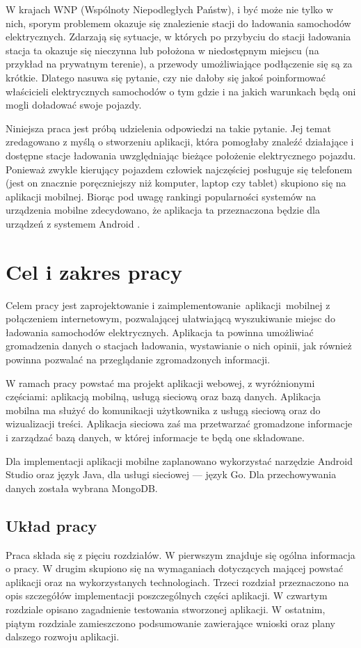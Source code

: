 W krajach WNP (Wspólnoty Niepodległych Państw), i być może nie tylko w nich, sporym problemem okazuje się znalezienie stacji do ładowania samochodów elektrycznych. Zdarzają się sytuacje, w których po przybyciu do stacji ładowania stacja ta okazuje się nieczynna lub położona w niedostępnym miejscu (na przykład na prywatnym terenie), a przewody umożliwiające podłączenie się są za krótkie. Dlatego nasuwa się pytanie, czy nie dałoby się jakoś poinformować właścicieli elektrycznych samochodów o tym gdzie i na jakich warunkach będą oni mogli doładować swoje pojazdy. 

Niniejsza praca jest próbą udzielenia odpowiedzi na takie pytanie. Jej temat zredagowano z myślą o stworzeniu aplikacji, która pomogłaby znaleźć działające i dostępne stacje ładowania uwzględniając bieżące położenie elektrycznego pojazdu. Ponieważ zwykle kierujący pojazdem człowiek najczęściej posługuje się telefonem (jest on znacznie poręczniejszy niż komputer, laptop czy tablet) skupiono się na aplikacji mobilnej. Biorąc pod uwagę rankingi popularności systemów na urządzenia mobilne zdecydowano, że aplikacja ta przeznaczona będzie dla urządzeń z systemem Android \cite{avi1}.


\section{Cel i zakres pracy}
Celem pracy jest zaprojektowanie i zaimplementowanie aplikacji mobilnej z połączeniem internetowym, pozwalającej ułatwiającą wyszukiwanie miejsc do ładowania samochodów elektrycznych. Aplikacja ta powinna umożliwiać gromadzenia danych o stacjach ładowania, wystawianie o nich opinii, jak również powinna pozwalać na przeglądanie zgromadzonych informacji. 

W ramach pracy powstać ma projekt aplikacji webowej, z wyróżnionymi częściami: aplikacją mobilną, usługą sieciową oraz bazą danych.
Aplikacja mobilna ma służyć do komunikacji użytkownika z usługą sieciową oraz do wizualizacji treści.
Aplikacja sieciowa zaś ma przetwarzać gromadzone informacje i zarządzać bazą danych, w której informacje te będą one składowane.

Dla implementacji aplikacji mobilne zaplanowano wykorzystać narzędzie Android Studio oraz język Java, dla usługi sieciowej — język Go. Dla przechowywania danych została wybrana MongoDB.

\subsection{Układ pracy}
Praca składa się z pięciu rozdziałów. W pierwszym znajduje się ogólna informacja o pracy.
W drugim skupiono się na wymaganiach dotyczących mającej powstać aplikacji oraz na wykorzystanych technologiach.
Trzeci rozdział przeznaczono na opis szczegółów implementacji poszczególnych części aplikacji.
W czwartym rozdziale opisano zagadnienie testowania stworzonej aplikacji.
W ostatnim, piątym rozdziale zamieszczono podsumowanie zawierające wnioski oraz plany dalszego rozwoju aplikacji.